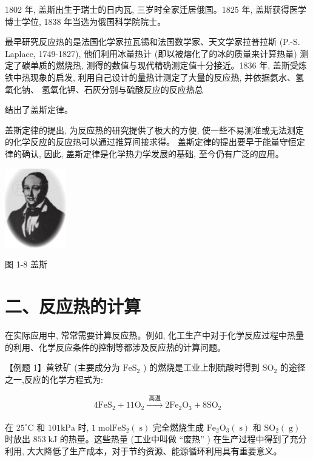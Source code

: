 \documentclass[10pt]{article}
\begin{document}
1802 年, 盖斯出生于瑞士的日内瓦, 三岁时全家迁居俄国。1825 年, 盖斯获得医学博士学位, 1838 年当选为俄国科学院院士。

最早研究反应热的是法国化学家拉瓦锡和法国数学家、天文学家拉普拉斯 (P.-S. Laplace, 1749-1827), 他们利用冰量热计 (即以被熔化了的冰的质量来计算热量) 测定了碳单质的燃烧热, 测得的数值与现代精确测定值十分接近。1836 年, 盖斯受炼铁中热现象的启发, 利用自己设计的量热计测定了大量的反应热, 并依据氨水、氢氧化钠、 氢氧化钾、石灰分别与硫酸反应的反应热总

结出了盖斯定律。

盖斯定律的提出, 为反应热的研究提供了极大的方便, 使一些不易测准或无法测定的化学反应的反应热可以通过推算间接求得。 盖斯定律的提出要早于能量守恒定律的确认, 因此, 盖斯定律是化学热力学发展的基础, 至今仍有广泛的应用。

\begin{center}
\includegraphics[max width=0.2\textwidth]{images/0190da9d-8bfd-732f-bc2c-0b21d0f13b91_21_788312.jpg}
\end{center}

图 1-8 盖斯

\section*{二、反应热的计算}

在实际应用中, 常常需要计算反应热。例如, 化工生产中对于化学反应过程中热量的利用、化学反应条件的控制等都涉及反应热的计算问题。

【例题 1】黄铁矿 (主要成分为 \({\mathrm{{FeS}}}_{2}\) ) 的燃烧是工业上制硫酸时得到 \({\mathrm{{SO}}}_{2}\) 的途径之一,反应的化学方程式为:

\[
4{\mathrm{{FeS}}}_{2} + {11}{\mathrm{O}}_{2}\xrightarrow[]{\text{ 高温 }}2{\mathrm{{Fe}}}_{2}{\mathrm{O}}_{3} + 8{\mathrm{{SO}}}_{2}
\]

在 \({25}^{ \circ }\mathrm{C}\) 和 \({101}\mathrm{{kPa}}\) 时, \(1\mathrm{\;{mol}}{\mathrm{{FeS}}}_{2}\left( \mathrm{\;s}\right)\) 完全燃烧生成 \({\mathrm{{Fe}}}_{2}{\mathrm{O}}_{3}\left( \mathrm{\;s}\right)\) 和 \({\mathrm{{SO}}}_{2}\left( \mathrm{\;g}\right)\) 时放出 \({853}\mathrm{\;{kJ}}\) 的热量。这些热量 (工业中叫做 “废热” ) 在生产过程中得到了充分利用, 大大降低了生产成本，对于节约资源、能源循环利用具有重要意义。
\end{document}
